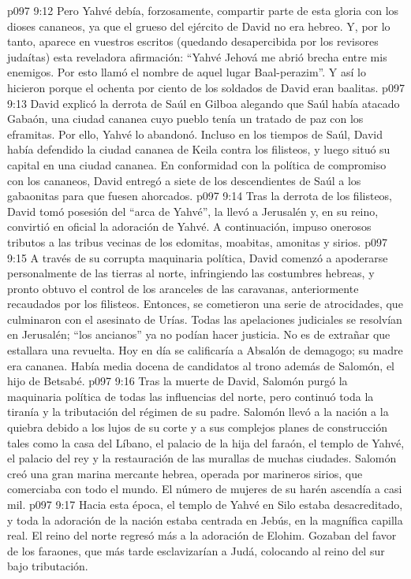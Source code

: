 \vs p097 9:12 Pero Yahvé debía, forzosamente, compartir parte de esta gloria con los dioses cananeos, ya que el grueso del ejército de David no era hebreo. Y, por lo tanto, aparece en vuestros escritos (quedando desapercibida por los revisores judaítas) esta reveladora afirmación: “Yahvé Jehová me abrió brecha entre mis enemigos. Por esto llamó el nombre de aquel lugar Baal\hyp{}perazim”. Y así lo hicieron porque el ochenta por ciento de los soldados de David eran baalitas.
\vs p097 9:13 David explicó la derrota de Saúl en Gilboa alegando que Saúl había atacado Gabaón, una ciudad cananea cuyo pueblo tenía un tratado de paz con los eframitas. Por ello, Yahvé lo abandonó. Incluso en los tiempos de Saúl, David había defendido la ciudad cananea de Keila contra los filisteos, y luego situó su capital en una ciudad cananea. En conformidad con la política de compromiso con los cananeos, David entregó a siete de los descendientes de Saúl a los gabaonitas para que fuesen ahorcados.
\vs p097 9:14 Tras la derrota de los filisteos, David tomó posesión del “arca de Yahvé”, la llevó a Jerusalén y, en su reino, convirtió en oficial la adoración de Yahvé. A continuación, impuso onerosos tributos a las tribus vecinas de los edomitas, moabitas, amonitas y sirios.
\vs p097 9:15 A través de su corrupta maquinaria política, David comenzó a apoderarse personalmente de las tierras al norte, infringiendo las costumbres hebreas, y pronto obtuvo el control de los aranceles de las caravanas, anteriormente recaudados por los filisteos. Entonces, se cometieron una serie de atrocidades, que culminaron con el asesinato de Urías. Todas las apelaciones judiciales se resolvían en Jerusalén; “los ancianos” ya no podían hacer justicia. No es de extrañar que estallara una revuelta. Hoy en día se calificaría a Absalón de demagogo; su madre era cananea. Había media docena de candidatos al trono además de Salomón, el hijo de Betsabé.
\vs p097 9:16 \pc Tras la muerte de David, Salomón purgó la maquinaria política de todas las influencias del norte, pero continuó toda la tiranía y la tributación del régimen de su padre. Salomón llevó a la nación a la quiebra debido a los lujos de su corte y a sus complejos planes de construcción tales como la casa del Líbano, el palacio de la hija del faraón, el templo de Yahvé, el palacio del rey y la restauración de las murallas de muchas ciudades. Salomón creó una gran marina mercante hebrea, operada por marineros sirios, que comerciaba con todo el mundo. El número de mujeres de su harén ascendía a casi mil.
\vs p097 9:17 \pc Hacia esta época, el templo de Yahvé en Silo estaba desacreditado, y toda la adoración de la nación estaba centrada en Jebús, en la magnífica capilla real. El reino del norte regresó más a la adoración de Elohim. Gozaban del favor de los faraones, que más tarde esclavizarían a Judá, colocando al reino del sur bajo tributación.
